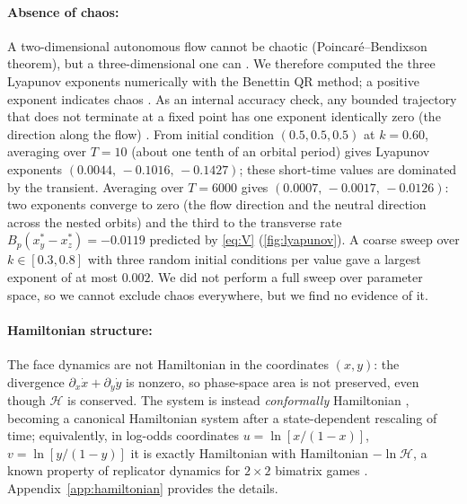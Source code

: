 \documentclass[10pt]{article}
\begin{document}
\paragraph{Absence of chaos:} A two-dimensional autonomous flow cannot be chaotic (Poincar\'e--Bendixson theorem), but a three-dimensional one can \cite{strogatz2024}. We therefore computed the three Lyapunov exponents numerically with the Benettin QR method; a positive exponent indicates chaos \cite{strogatz2024}. As an internal accuracy check, any bounded trajectory that does not terminate at a fixed point has one exponent identically zero (the direction along the flow) \cite{haken1983}. From initial condition $(0.5,0.5,0.5)$ at $k=0.60$, averaging over $T=10$ (about one tenth of an orbital period) gives Lyapunov exponents $(0.0044,\,-0.1016,\,-0.1427)$; these short-time values are dominated by the transient. Averaging over $T=6000$ gives $(0.0007,\,-0.0017,\,-0.0126)$: two exponents converge to zero (the flow direction and the neutral direction across the nested orbits) and the third to the transverse rate $B_p(x_y^*-x_z^*)=-0.0119$ predicted by \cref{eq:V} (\cref{fig:lyapunov}). A coarse sweep over $k\in[0.3,0.8]$ with three random initial conditions per value gave a largest exponent of at most $0.002$. We did not perform a full sweep over parameter space, so we cannot exclude chaos everywhere, but we find no evidence of it.

\paragraph{Hamiltonian structure:} The face dynamics are not Hamiltonian in the coordinates $(x,y)$: the divergence $\partial_x\dot x+\partial_y\dot y$ is nonzero, so phase-space area is not preserved, even though $\mathcal{H}$ is conserved. The system is instead \emph{conformally} Hamiltonian \cite{garcia2020}, becoming a canonical Hamiltonian system after a state-dependent rescaling of time; equivalently, in log-odds coordinates $u=\ln[x/(1-x)]$, $v=\ln[y/(1-y)]$ it is exactly Hamiltonian with Hamiltonian $-\ln\mathcal{H}$, a known property of replicator dynamics for $2\times2$ bimatrix games \cite{hofbauer1996}. Appendix~\ref{app:hamiltonian} provides the details.
\end{document}
